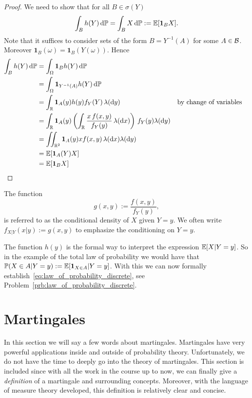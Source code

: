 \begin{proof}
We need to show that for all $B \in \sigma(Y)$
\[
	\int_B h(Y) \, \mathrm{d} \mathbb P = \int_B X \, \mathrm{d} \mathbb P := \mathbb E[\mathbf{1}_B X]. 
\]
Note that it suffices to consider sets of the form $B = Y^{-1}(A)$ for some $A \in \mathcal B$. Moreover $\mathbf{1}_B(\omega) = \mathbf{1}_B(Y(\omega))$. Hence
\begin{align*}
	\int_B h(Y) \, \mathrm{d} \mathbb P &= \int_\Omega \mathbf{1}_{B} h(Y) \, \mathrm{d} \mathbb P \\
	&= \int_\Omega \mathbf{1}_{Y^{-1}(A)} h(Y) \, \mathrm{d} \mathbb P \\
	&= \int_{\mathbb R} \mathbf{1}_{A}(y) h(y) f_Y(Y) \, \lambda (\mathrm{d} y) &&\text{by change of variables}\\
	&= \int_{\mathbb R} \mathbf{1}_A(y) \left(\int_{\mathbb R} \frac{x \, f(x,y)}{f_Y(y)} \, \lambda(\mathrm{d} x)\right)
		\, f_Y(y) \lambda(\mathrm{d} y)\\
	&= \iint_{\mathbb R^2} \mathbf{1}_A(y) x f(x,y) \, \lambda(\mathrm{d} x) \lambda(\mathrm{d} y)\\
	&= \mathbb E[\mathbf{1}_A(Y) X]\\
	&= \mathbb E[\mathbf{1}_B X] 
\end{align*}
\end{proof}

The function
\begin{equation}
	g(x,y) := \frac{f(x,y)}{f_Y(y)},
\end{equation}
is referred to as the conditional density of $X$ given $Y = y$. We often write $f_{X|Y}(x|y) := g(x,y)$ to emphasize the conditioning on $Y = y$.

The function $h(y)$ is the formal way to interpret the expression $\mathbb E[X | Y=y]$. So in the example of the total law of probability we would have that $\mathbb P(X\in A | Y = y) := \mathbb E[\mathbf{1}_{X \in A} | Y = y]$. With this we can now formally establish~\eqref{eq:law_of_probability_discrete}, see Problem~\ref{prb:law_of_probability_discrete}.
\section{Martingales}

In this section we will say a few words about martingales. Martingales have very powerful applications inside and outside of probability theory. Unfortunately, we do not have the time to deeply go into the theory of martingales. This section is included since with all the work in the course up to now, we can finally give a \emph{definition} of a martingale and surrounding concepts. Moreover, with the language of measure theory developed, this definition is relatively clear and concise.

